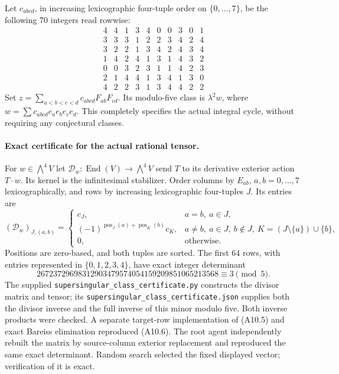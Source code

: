 \documentclass[11pt]{article}
\theoremstyle{remark}\newtheorem{remark}[theorem]{Remark}
\begin{document}
Let $c_{abcd}$, in increasing lexicographic four-tuple order
on $\{0,\ldots,7\}$, be the following 70 integers read rowwise:
\[
\begin{array}{rrrrrrrrrr}
4&4&1&3&4&0&0&3&0&1\\
3&3&3&1&2&2&3&4&2&4\\
3&2&2&1&3&4&2&4&3&4\\
1&4&2&4&1&3&1&4&3&2\\
0&0&3&2&3&1&1&4&2&3\\
2&1&4&4&1&3&4&1&3&0\\
4&2&2&3&1&3&4&4&2&2
\end{array}
\]
Set $z=\sum_{a<b<c<d}c_{abcd}F_{ab}F_{cd}$.
Its modulo-five class is $\lambda^2w$, where
$w=\sum c_{abcd}e_ae_be_ce_d$. This completely specifies the
actual integral cycle, without requiring any conjectural classes.

\paragraph{Exact certificate for the actual rational tensor.}
For $w\in\bigwedge^4V$ let
$\mathcal D_w:\operatorname{End}(V)\to\bigwedge^4V$ send
$T$ to its derivative exterior action $T\cdot w$.
Its kernel is the infinitesimal stabilizer.
Order columns by $E_{ab}$, $a,b=0,\ldots,7$ lexicographically,
and rows by increasing lexicographic four-tuples $J$.
Its entries are
\[
 (\mathcal D_w)_{J,(a,b)}=
 \begin{cases}
 c_J,&a=b,\ a\in J,\\
 (-1)^{\operatorname{pos}_J(a)+\operatorname{pos}_K(b)}c_K,
 &a\ne b,\ a\in J,\ b\notin J,\ K=(J\setminus\{a\})\cup\{b\},\\
 0,&\text{otherwise}.
 \end{cases}                                                \tag{A10.5}
\]
Positions are zero-based, and both tuples are sorted.
The first 64 rows, with entries represented in $\{0,1,2,3,4\}$,
have exact integer determinant
\[
 26723729698312903479574054159209851065213568
                       \equiv3\pmod5.                       \tag{A10.6}
\]
The supplied \texttt{supersingular\_class\_certificate.py}
constructs the divisor matrix and tensor; its
\texttt{supersingular\_class\_certificate.json} supplies both
the divisor inverse and the full inverse of this minor modulo
five. Both inverse products were checked.
A separate target-row implementation of (A10.5) and exact Bareiss
elimination reproduced (A10.6). The root agent independently
rebuilt the matrix by source-column exterior replacement and
reproduced the same exact determinant. Random search selected
the fixed displayed vector; verification of it is exact.
\end{document}
